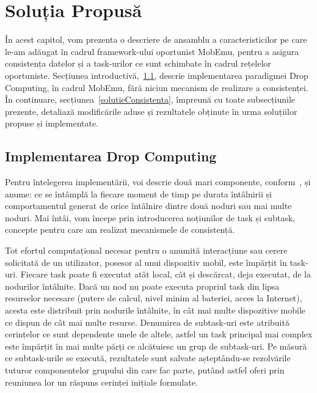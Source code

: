 \documentclass[12pt,a4paper]{report}
\begin{document}
\chapter{Soluția Propusă} \label{solutiaPropusa}

În acest capitol, vom prezenta o descriere de ansamblu a caracteristicilor pe care le-am adăugat în cadrul framework-ului oportunist MobEmu, pentru a asigura consistența datelor și a task-urilor ce sunt schimbate în cadrul rețelelor oportuniste. 
Secțiunea introductivă,~\ref{dropcomputing}, descrie implementarea paradigmei Drop Computing, în cadrul MobEmu, fără niciun mecanism de realizare a consistenței. În continuare, secțiunea~\ref{solutieConsistenta}, împreună cu toate subsecțiunile prezente, detaliază modificările aduse și rezultatele obținute în urma soluțiilor propuse și implementate.

\section{Implementarea Drop Computing} \label{dropcomputing}
Pentru întelegerea implementării, voi descrie două mari componente, conform~\cite{MobEmuArticle},  și anume: ce se întâmplă la fiecare moment de timp pe durata întâlnirii și comportamentul generat de orice întâlnire dintre două noduri sau mai multe noduri. Mai întâi, vom începe prin introducerea noțiunilor de task și subtask, concepte pentru care am realizat mecanismele de consistență.

Tot efortul computațional necesar pentru o anumită interacțiune sau cerere solicitată de un utilizator, posesor al unui dispozitiv mobil, este împărțit în task-uri. Fiecare task poate fi executat atât local, cât și descărcat, deja executat, de la nodurilor întâlnite. Dacă un nod nu poate executa propriul task din lipsa resurselor necesare (putere de calcul, nivel minim al bateriei, acces la Internet), acesta este distribuit prin nodurile întâlnite, în cât mai multe dispozitive mobile ce dispun de cât mai multe resurse. Denumirea de subtask-uri este atribuită cerințelor ce sunt dependente unele de altele, astfel un task principal mai complex este împărțit în mai multe părți ce alcătuiesc un grup de subtask-uri. Pe măsură ce subtask-urile se execută, rezultatele sunt salvate așteptându-se rezolvările tuturor componentelor grupului din care fac parte, putând astfel oferi prin reuniunea lor un răspuns cerinței inițiale formulate. 
\end{document}
